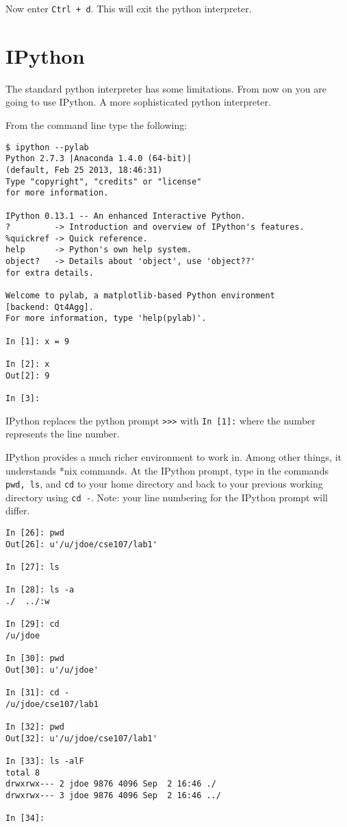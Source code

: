 \documentclass[12pt]{article}
\begin{document}
Now enter \texttt{Ctrl + d}. This will exit the python interpreter.

\section{IPython}

The standard python interpreter has some limitations. From now on you are going to use IPython. A more sophisticated python interpreter.

From the command line type the following:
\begin{lstlisting}[style=bash]
$ ipython --pylab 
Python 2.7.3 |Anaconda 1.4.0 (64-bit)| 
(default, Feb 25 2013, 18:46:31) 
Type "copyright", "credits" or "license" 
for more information.

IPython 0.13.1 -- An enhanced Interactive Python.
?         -> Introduction and overview of IPython's features.
%quickref -> Quick reference.
help      -> Python's own help system.
object?   -> Details about 'object', use 'object??' 
for extra details.

Welcome to pylab, a matplotlib-based Python environment 
[backend: Qt4Agg].
For more information, type 'help(pylab)'.

In [1]: x = 9

In [2]: x
Out[2]: 9

In [3]: 
\end{lstlisting}

IPython replaces the python prompt \texttt{>>>} with \texttt{In [1]:} where the number represents the line number.

IPython provides a much richer environment to work in. Among other things, it understands *nix commands. At the IPython prompt, type in the commands \texttt{pwd, ls}, and \texttt{cd} to your home directory and back to your previous working directory using \texttt{cd -}. Note: your line numbering for the IPython prompt will differ.

\begin{lstlisting}[style=bash]
In [26]: pwd
Out[26]: u'/u/jdoe/cse107/lab1'

In [27]: ls

In [28]: ls -a
./  ../:w

In [29]: cd
/u/jdoe

In [30]: pwd
Out[30]: u'/u/jdoe'

In [31]: cd -
/u/jdoe/cse107/lab1

In [32]: pwd
Out[32]: u'/u/jdoe/cse107/lab1'

In [33]: ls -alF
total 8
drwxrwx--- 2 jdoe 9876 4096 Sep  2 16:46 ./
drwxrwx--- 3 jdoe 9876 4096 Sep  2 16:46 ../

In [34]:
\end{lstlisting}
\end{document}

